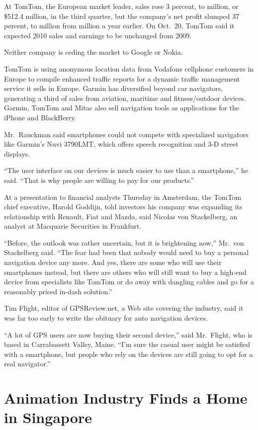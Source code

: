 ﻿\documentclass[12pt]{article}
\begin{document}
At TomTom, the European market leader, sales rose 3 percent, to  million, or \$512.4
million, in the third quarter, but the company's net profit slumped 37 percent, to 
million from  million a year earlier. On Oct.~20, TomTom said it expected 2010 sales and
earnings to be unchanged from 2009.

Neither company is ceding the market to Google or Nokia.

TomTom is using anonymous location data from Vodafone cellphone customers in Europe to compile
enhanced traffic reports for a dynamic traffic management service it sells in Europe. Garmin has
diversified beyond car navigators, generating a third of sales from aviation, maritime and
fitness/outdoor devices. Garmin, TomTom and Mitac also sell navigation tools as applications for the
iPhone and BlackBerry.

Mr.~Rauckman said smartphones could not compete with specialized navigators like Garmin's Nuvi
3790LMT, which offers speech recognition and 3-D street displays.

``The user interface on our devices is much easier to use than a smartphone,'' he said. ``That is
why people are willing to pay for our products.''

At a presentation to financial analysts Thursday in Amsterdam, the TomTom chief executive, Harold
Goddijn, told investors his company was expanding its relationship with Renault, Fiat and Mazda,
said Nicolas von Stackelberg, an analyst at Macquarie Securities in Frankfurt.

``Before, the outlook was rather uncertain, but it is brightening now,'' Mr.~von Stackelberg said.
``The fear had been that nobody would need to buy a personal navigation device any more. And yes,
there are some who will use their smartphones instead, but there are others who will still want to
buy a high-end device from specialists like TomTom or do away with dangling cables and go for a
reasonably priced in-dash solution.''

Tim Flight, editor of GPSReview.net, a Web site covering the industry, said it was far too early to
write the obituary for auto navigation devices.

``A lot of GPS users are now buying their second device,'' said Mr.~Flight, who is based in
Carrabassett Valley, Maine. ``I'm sure the casual user might be satisfied with a smartphone, but
people who rely on the devices are still going to opt for a real navigator.''

\section{Animation Industry Finds a Home in Singapore}
\end{document}
